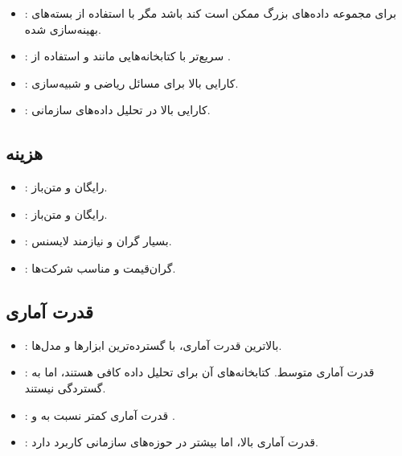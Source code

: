 \documentclass[11pt, a4paper, oneside]{book}
\begin{document}
				\begin{itemize}
					
					\item {\large {}}:
					{\normalsize برای مجموعه داده‌های بزرگ ممکن است کند باشد مگر با استفاده از بسته‌های بهینه‌سازی شده.}
					
					\item {\large {}}:
					{\normalsize سریع‌تر با کتابخانه‌هایی مانند  و استفاده از .}
					
					\item {\large {}}:
					{\normalsize کارایی بالا برای مسائل ریاضی و شبیه‌سازی.}
					
					\item {\large {}}:
					{\normalsize کارایی بالا در تحلیل داده‌های سازمانی.}
					
				\end{itemize}
				
				
				\subsection{هزینه}
				
				\begin{itemize}
					
					\item {\large {}}:
					{\normalsize رایگان و متن‌باز.}
					
					\item {\large {}}:
					{\normalsize رایگان و متن‌باز.}
					
					\item {\large {}}:
					{\normalsize بسیار گران و نیازمند لایسنس.}
					
					\item {\large {}}:
					{\normalsize گران‌قیمت و مناسب شرکت‌ها.}
					
				\end{itemize}
				
				
				\subsection{قدرت آماری}
				
				\begin{itemize}
					
					\item {\large {}}:
					{\normalsize بالاترین قدرت آماری، با گسترده‌ترین ابزارها و مدل‌ها.}
					
					\item {\large {}}:
					{\normalsize قدرت آماری متوسط. کتابخانه‌های آن برای تحلیل داده کافی هستند، اما به گستردگی  نیستند.}
					
					\item {\large {}}:
					{\normalsize قدرت آماری کمتر نسبت به  و .}
					
					\item {\large {}}:
					{\normalsize قدرت آماری بالا، اما بیشتر در حوزه‌های سازمانی کاربرد دارد.}
					
				\end{itemize}
				
\end{document}
